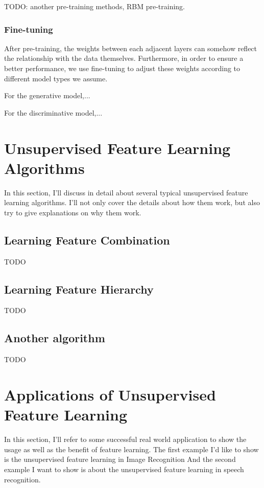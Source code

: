 \documentclass[conference]{IEEEtran}
\begin{document}
TODO: another pre-training methods, RBM pre-training.

\subsubsection{Fine-tuning}

After pre-training, the weights between each adjacent layers can somehow reflect the relationship with the data themselves. Furthermore, in order to ensure a better performance, we use fine-tuning to adjust these weights according to different model types we assume.

For the generative model,...

For the discriminative model,...





\section{Unsupervised Feature Learning Algorithms}

In this section, I'll discuss in detail about several typical unsupervised feature learning algorithms. I'll not only cover the details about how them work, but also try to give explanations on why them work.


\subsection{Learning Feature Combination}

TODO

\subsection{Learning Feature Hierarchy}

TODO

\subsection{Another algorithm}

TODO

\section{Applications of Unsupervised Feature Learning}

In this section, I'll refer to some successful real world application to show the usage as well as the benefit of feature learning. The first example I'd like to show is the unsupervised feature learning in Image Recognition
And the second example I want to show is about the unsupervised feature learning in speech recognition.
\end{document}
